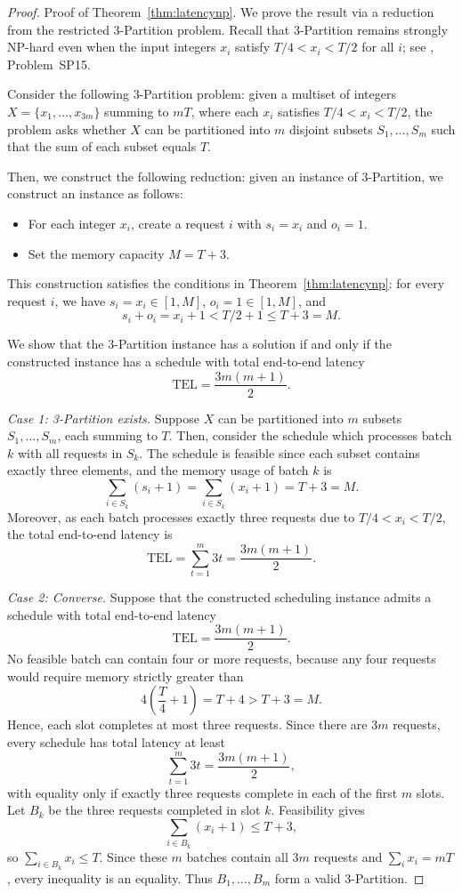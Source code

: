 \documentclass[nonblindrev]{informs3_hide}
\begin{document}
\begin{proof}{Proof of Theorem~\ref{thm:latencynp}.}
We prove the result via a reduction from the restricted 3-Partition problem. Recall that 3-Partition remains strongly NP-hard even when the input integers $x_i$ satisfy $T/4 < x_i < T/2$ for all $i$; see \cite{gareyjohnson1979}, Problem~SP15.

Consider the following 3-Partition problem: given a multiset of integers
$X=\{x_1,\ldots,x_{3m}\}$ summing to $mT$, where each $x_i$ satisfies
$T/4 < x_i < T/2$, the problem asks whether $X$ can be partitioned into
$m$ disjoint subsets $S_1,\ldots,S_m$ such that the sum of each subset equals $T$.

Then, we construct the following reduction: given an instance of 3-Partition, we construct an instance as follows:
\begin{itemize}
    \item For each integer $x_i$, create a request $i$ with $s_i=x_i$ and $o_i=1$.
    \item Set the memory capacity $M=T+3$.
\end{itemize}

This construction satisfies the conditions in Theorem~\ref{thm:latencynp}: for every request $i$, we have $s_i=x_i\in[1,M]$, $o_i=1\in[1,M]$, and
\[
s_i+o_i=x_i+1<T/2+1\le T+3=M.
\]

We show that the 3-Partition instance has a solution if and only if the constructed instance has a schedule with total end-to-end latency
\[
\mathrm{TEL}=\frac{3m(m+1)}2.
\]

\textit{Case 1: 3-Partition exists.}
Suppose $X$ can be partitioned into $m$ subsets $S_1,\ldots,S_m$, each summing to $T$. Then, consider the schedule which processes batch $k$ with all requests in $S_k$.
The schedule is feasible since each subset contains exactly three elements, and the memory usage of batch $k$ is
\[
\sum_{i\in S_k}(s_i+1)=\sum_{i\in S_k}(x_i+1)=T+3=M.
\]
Moreover, as each batch processes exactly three requests due to $T/4<x_i<T/2$, the total end-to-end latency is
\[
\mathrm{TEL}=\sum_{t=1}^m3t=\frac{3m(m+1)}2.
\]

\textit{Case 2: Converse.}
Suppose that the constructed scheduling instance admits a schedule
with total end-to-end latency
\[
\mathrm{TEL}=\frac{3m(m+1)}{2}.
\]
No feasible batch can contain four or more requests, because any four requests would require memory strictly greater than
\[
4\left(\frac T4+1\right)=T+4>T+3=M.
\]
Hence, each slot completes at most three requests. Since there are $3m$ requests, every schedule has total latency at least
\[
\sum_{t=1}^m3t=\frac{3m(m+1)}2,
\]
with equality only if exactly three requests complete in each of the first $m$ slots. Let $B_k$ be the three requests completed in slot $k$. Feasibility gives
\[
\sum_{i\in B_k}(x_i+1)\le T+3,
\]
so $\sum_{i\in B_k}x_i\le T$. Since these $m$ batches contain all $3m$ requests and $\sum_i x_i=mT$, every inequality is an equality. Thus $B_1,\ldots,B_m$ form a valid 3-Partition.


\end{proof}
\end{document}

